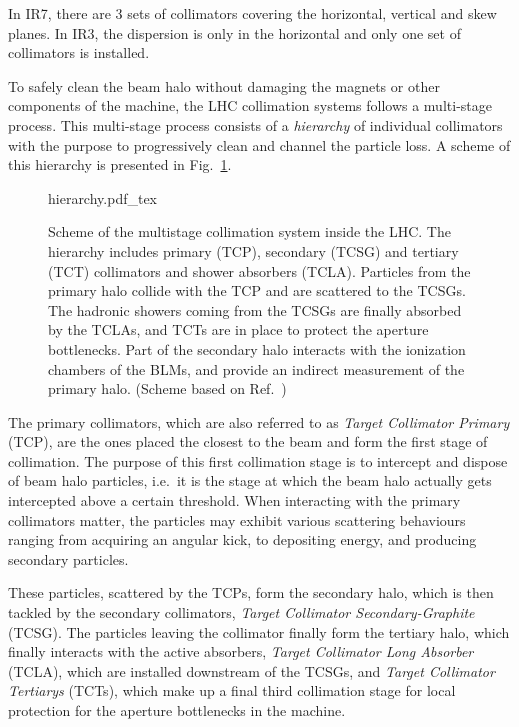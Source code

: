 In IR7, there are 3 sets of collimators covering the horizontal, vertical and skew planes. In IR3, the dispersion is only in the horizontal and only one set of collimators is installed.

To safely clean the beam halo without damaging the magnets or other components of the machine, the LHC collimation systems follows a multi-stage process. This multi-stage process consists of a \textit{hierarchy} of individual collimators with the purpose to progressively clean and channel the particle loss. A scheme of this hierarchy is presented in Fig.~\ref{fig:collimator_hierarchy}.

\begin{figure}[hpt]
    \centering
    \def\svgwidth{1.0\columnwidth}
    {hierarchy.pdf_tex}
    \caption{Scheme of the multistage collimation system inside the LHC. The hierarchy includes primary (TCP), secondary (TCSG) and tertiary (TCT) collimators and shower absorbers (TCLA). Particles from the primary halo collide with the TCP and are scattered to the TCSGs. The hadronic showers coming from the TCSGs are finally absorbed by the TCLAs, and TCTs are in place to protect the aperture bottlenecks. Part of the secondary halo interacts with the ionization chambers of the BLMs, and provide an indirect measurement of the primary halo. (Scheme based on Ref.~\cite{Hermes:2241364})}
    \label{fig:collimator_hierarchy}
\end{figure}

The primary collimators, which are also referred to as \textit{Target Collimator Primary} (TCP), are the ones placed the closest to the beam and form the first stage of collimation. The purpose of this first collimation stage is to intercept and dispose of beam halo particles, i.e.\ it is the stage at which the beam halo actually gets intercepted above a certain threshold. When interacting with the primary collimators matter, the particles may exhibit various scattering behaviours ranging from acquiring an angular kick, to depositing energy, and producing secondary particles. 

These particles, scattered by the TCPs, form the secondary halo, which is then tackled by the secondary collimators, \textit{Target Collimator Secondary-Graphite} (TCSG). The particles leaving the collimator finally form the tertiary halo, which finally interacts with the active absorbers, \textit{Target Collimator Long Absorber} (TCLA), which are installed downstream of the TCSGs, and \textit{Target Collimator Tertiarys} (TCTs), which make up a final third collimation stage for local protection for the aperture bottlenecks in the machine.

